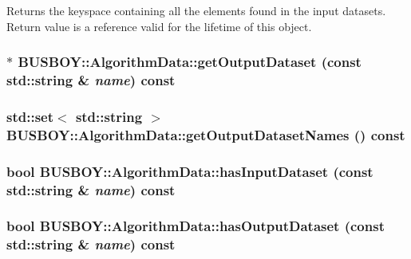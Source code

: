 Returns the keyspace containing all the elements found in the input datasets. Return value is a reference valid for the lifetime of this object. \hypertarget{classBUSBOY_1_1AlgorithmData_a56c797c91372f44e9c6b2c94c63809d5}{
\subsubsection[{getOutputDataset}]{ $\ast$ BUSBOY::AlgorithmData::getOutputDataset (const std::string \& {\em name}) const}}
\label{classBUSBOY_1_1AlgorithmData_a56c797c91372f44e9c6b2c94c63809d5}
\hypertarget{classBUSBOY_1_1AlgorithmData_a666c188ae0cc5504d2ef4ee4f460d56f}{
\subsubsection[{getOutputDatasetNames}]{\setlength{\rightskip}{0pt plus 5cm}std::set$<$ std::string $>$ BUSBOY::AlgorithmData::getOutputDatasetNames () const}}
\label{classBUSBOY_1_1AlgorithmData_a666c188ae0cc5504d2ef4ee4f460d56f}
\hypertarget{classBUSBOY_1_1AlgorithmData_a26f8d2f506f315856870c83397974e86}{
\subsubsection[{hasInputDataset}]{\setlength{\rightskip}{0pt plus 5cm}bool BUSBOY::AlgorithmData::hasInputDataset (const std::string \& {\em name}) const}}
\label{classBUSBOY_1_1AlgorithmData_a26f8d2f506f315856870c83397974e86}
\hypertarget{classBUSBOY_1_1AlgorithmData_a3c6fb3cbbedff5f3ac838aec02512968}{
\subsubsection[{hasOutputDataset}]{\setlength{\rightskip}{0pt plus 5cm}bool BUSBOY::AlgorithmData::hasOutputDataset (const std::string \& {\em name}) const}}
